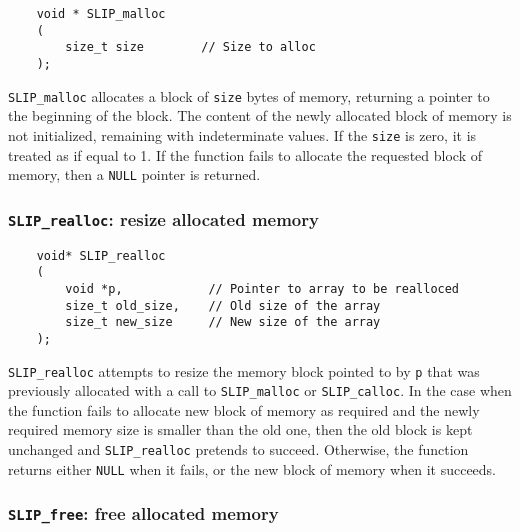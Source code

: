 \documentclass[12pt]{article}
\theoremstyle{definition}
\begin{document}
\begin{mdframed}[userdefinedwidth=6in]
{\footnotesize
\begin{verbatim}
    void * SLIP_malloc
    (
        size_t size        // Size to alloc
    );
\end{verbatim}
} \end{mdframed}

\verb|SLIP_malloc| allocates a block of \verb|size| bytes of memory, returning
a pointer to the beginning of the block. The content of the newly allocated
block of memory is not initialized, remaining with indeterminate values.  If
the \verb|size| is zero, it is treated as if equal to 1.  If the function fails
to allocate the requested block of memory, then a \verb|NULL| pointer is
returned.

\cprotect\subsubsection{\verb|SLIP_realloc|: resize allocated memory}
\label{ss:SLIP_realloc}

\begin{mdframed}[userdefinedwidth=6in]
{\footnotesize
\begin{verbatim}
    void* SLIP_realloc
    (
        void *p,            // Pointer to array to be realloced
        size_t old_size,    // Old size of the array
        size_t new_size     // New size of the array
    );
\end{verbatim}
} \end{mdframed}

\verb|SLIP_realloc| attempts to resize the memory block pointed to by \verb|p|
that was previously allocated with a call to \verb|SLIP_malloc| or
\verb|SLIP_calloc|. In the case when the function fails to allocate new block
of memory as required and the newly required memory size is smaller than the
old one, then the old block is kept unchanged and \verb|SLIP_realloc| pretends
to succeed. Otherwise, the function returns either \verb|NULL| when it fails,
or the new block of memory when it succeeds.

\cprotect\subsubsection{\verb|SLIP_free|: free allocated memory}
\label{ss:SLIP_free}
\end{document}
